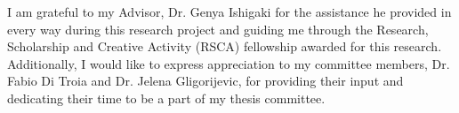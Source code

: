 I am grateful to my Advisor, Dr. Genya Ishigaki for the assistance he provided in every way during this research project and guiding me through the Research, Scholarship and Creative Activity (RSCA) fellowship awarded for this research. Additionally, I would like to express appreciation to my committee members, Dr. Fabio Di Troia and Dr. Jelena Gligorijevic, for providing their input and dedicating their time to be a part of my thesis committee.